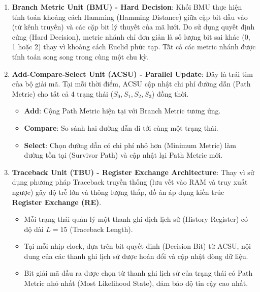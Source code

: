 \documentclass[12pt,a4paper]{report}
\begin{document}
\begin{enumerate}
    \item \textbf{Branch Metric Unit (BMU) - Hard Decision}:
    Khối BMU thực hiện tính toán khoảng cách Hamming (Hamming Distance) giữa cặp bit đầu vào (từ kênh truyền) và các cặp bit lý thuyết của mã lưới. Do sử dụng quyết định cứng (Hard Decision), metric nhánh chỉ đơn giản là số lượng bit sai khác (0, 1 hoặc 2) thay vì khoảng cách Euclid phức tạp. Tất cả các metric nhánh được tính toán song song trong cùng một chu kỳ.

    \item \textbf{Add-Compare-Select Unit (ACSU) - Parallel Update}:
    Đây là trái tim của bộ giải mã. Tại mỗi thời điểm, ACSU cập nhật chi phí đường dẫn (Path Metric) cho tất cả 4 trạng thái ($S_0, S_1, S_2, S_3$) đồng thời.
    \begin{itemize}
        \item \textbf{Add}: Cộng Path Metric hiện tại với Branch Metric tương ứng.
        \item \textbf{Compare}: So sánh hai đường dẫn đi tới cùng một trạng thái.
        \item \textbf{Select}: Chọn đường dẫn có chi phí nhỏ hơn (Minimum Metric) làm đường tồn tại (Survivor Path) và cập nhật lại Path Metric mới.
    \end{itemize}

    \item \textbf{Traceback Unit (TBU) - Register Exchange Architecture}:
    Thay vì sử dụng phương pháp Traceback truyền thống (lưu vết vào RAM và truy xuất ngược) gây độ trễ lớn và thông lượng thấp, đồ án áp dụng kiến trúc \textbf{Register Exchange (RE)}.
    \begin{itemize}
        \item Mỗi trạng thái quản lý một thanh ghi dịch lịch sử (History Register) có độ dài $L=15$ (Traceback Length).
        \item Tại mỗi nhịp clock, dựa trên bit quyết định (Decision Bit) từ ACSU, nội dung của các thanh ghi lịch sử được hoán đổi và cập nhật dòng dữ liệu.
        \item Bit giải mã đầu ra được chọn từ thanh ghi lịch sử của trạng thái có Path Metric nhỏ nhất (Most Likelihood State), đảm bảo độ tin cậy cao nhất.
    \end{itemize}
\end{enumerate}

\end{document}
